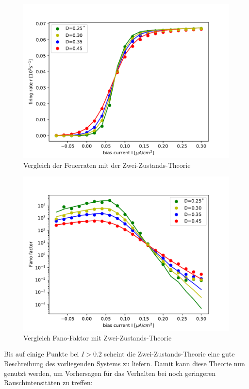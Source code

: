 \documentclass[12pt,a4paper]{article}
\begin{document}
\begin{figure}[H]
\centering
\includegraphics[scale=0.5]{ratenofit.pdf}\caption{Vergleich der Feuerraten mit der Zwei-Zustands-Theorie}
\label{gcomp}
\end{figure}
\begin{figure}[H]
	\centering
	\includegraphics[scale=0.5]{fanonofit.pdf}\caption{Vergleich Fano-Faktor mit Zwei-Zustands-Theorie}
	\label{fanocomp}
\end{figure}
Bis auf einige Punkte bei $I>0.2$ scheint die Zwei-Zustands-Theorie eine gute Beschreibung des vorliegenden Systems zu liefern. Damit kann diese Theorie nun genutzt werden, um Vorhersagen für das Verhalten bei noch geringeren Rauschintensitäten zu treffen:
\end{document}
